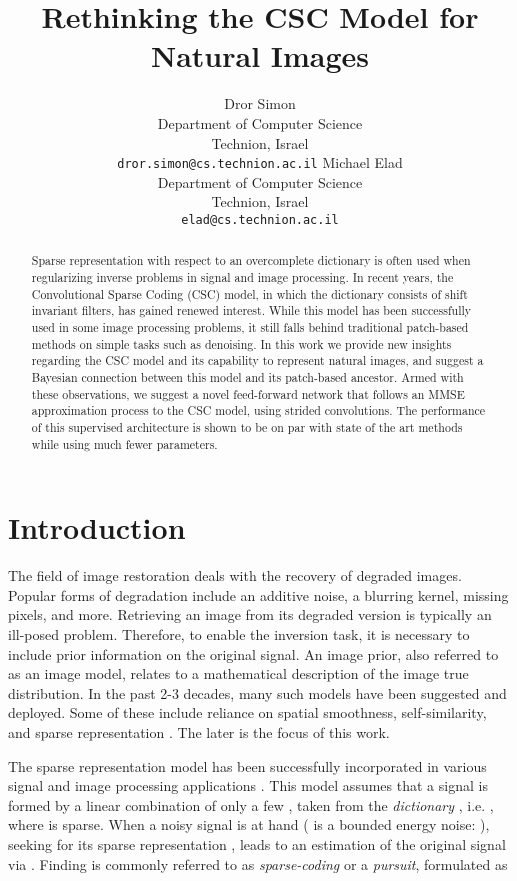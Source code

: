 \documentclass{article}
\title{Rethinking the CSC Model for Natural Images}
\author{
  Dror Simon \\
  Department of Computer Science\\
  Technion, Israel \\
  \texttt{dror.simon@cs.technion.ac.il}
  \And
  Michael Elad\\
  Department of Computer Science\\
  Technion, Israel \\
  \texttt{elad@cs.technion.ac.il}
}
\begin{document}
\maketitle

\begin{abstract}
  Sparse representation with respect to an overcomplete dictionary is often used when regularizing inverse problems in signal and image processing. In recent years, the Convolutional Sparse Coding (CSC) model, in which the dictionary consists of shift invariant filters, has gained renewed interest. While this model has been successfully used in some image processing problems, it still falls behind traditional patch-based methods on simple tasks such as denoising.
  In this work we provide new insights regarding the CSC model and its capability to represent natural images, and suggest a Bayesian connection between this model and its patch-based ancestor. Armed with these observations, we suggest a novel feed-forward network that follows an MMSE approximation process to the CSC model, using strided convolutions. The performance of this supervised architecture is shown to be on par with state of the art methods while using much fewer parameters.
\end{abstract}



\section{Introduction}
\label{sec:introduction}
The field of image restoration deals with the recovery of degraded images. Popular forms of degradation include an additive noise, a blurring kernel, missing pixels, and more. Retrieving an image from its degraded version is typically an ill-posed problem. Therefore, to enable the inversion task, it is necessary to include prior information on the original signal. An image prior, also referred to as an image model, relates to a mathematical description of the image true distribution. In the past 2-3 decades, many such models have been suggested and deployed. Some of these include reliance on spatial smoothness, self-similarity, and sparse representation \cite{rudin1992nonlinear,dabov2007image,elad2006image,buades2005non}. The later is the focus of this work.

The sparse representation model has been successfully incorporated in various signal and image processing applications \cite{dong2011image,dabov2007image,salmon2014poisson,dong2012nonlocally,ravishankar2011mr,plumbley2009sparse}. This model assumes that a signal  is formed by a linear combination of only a few , taken from the \emph{dictionary} , i.e. , where  is sparse. When a noisy signal  is at hand ( is a bounded energy noise: ), seeking for its sparse representation , leads to an estimation of the original signal via . Finding  is commonly referred to as \emph{sparse-coding} or a \emph{pursuit}, formulated as 
\end{document}
